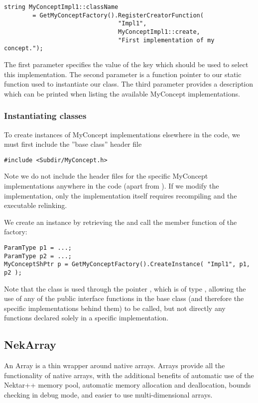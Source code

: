 \begin{lstlisting}[style=C++Style] 
string MyConceptImpl1::className
        = GetMyConceptFactory().RegisterCreatorFunction(
                                "Impl1", 
                                MyConceptImpl1::create, 
                                "First implementation of my concept.");
\end{lstlisting}
The first parameter specifies the value of the key which should be used to
select this implementation. The second parameter is a function pointer to our
static function used to instantiate our class. The third parameter provides a
description which can be printed when listing the available MyConcept
implementations.

\subsubsection{Instantiating classes}
To create instances of MyConcept implementations elsewhere in the code, we must
first include the ''base class'' header file
\begin{lstlisting}[style=C++Style]
#include <Subdir/MyConcept.h>
\end{lstlisting}
Note we do not include the header files for the specific MyConcept 
implementations anywhere in the code (apart from ).
If we modify the implementation, only the implementation itself requires 
recompiling and the executable relinking.

We create an instance by retrieving the  and call the
 member function of the factory:
\begin{lstlisting}[style=C++Style]
ParamType p1 = ...;
ParamType p2 = ...;
MyConceptShPtr p = GetMyConceptFactory().CreateInstance( "Impl1", p1, p2 );
\end{lstlisting}

Note that the class is used through the pointer , which is of type
, allowing the use of any of the public interface
functions in the base class (and therefore the specific implementations behind them) to be
called, but not directly any functions declared solely in a specific
implementation.


\subsection{NekArray}
An Array is a thin wrapper around native arrays. Arrays provide all the
functionality of native arrays, with the additional benefits of automatic use of
the Nektar++ memory pool, automatic memory allocation and deallocation, bounds
checking in debug mode, and easier to use multi-dimensional arrays.

